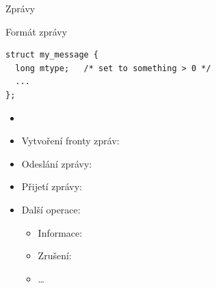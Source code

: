 \begin{frame}[fragile]{Zprávy}

  \begin{block}{Formát zprávy}
  \begin{lstlisting}
struct my_message {
  long mtype;   /* set to something > 0 */
  ...
};
  \end{lstlisting}
  \end{block}

  \pause

  \begin{itemize}
    \item {}
    \item Vytvoření fronty zpráv: 

    \pause

    \item Odeslání zprávy: 
    \item Přijetí zprávy: 

    \pause

    \item Další operace: 
    \begin{itemize}
      \item Informace: 
      \item Zrušení: 
      \item \dots
    \end{itemize}
  \end{itemize}

\end{frame}

